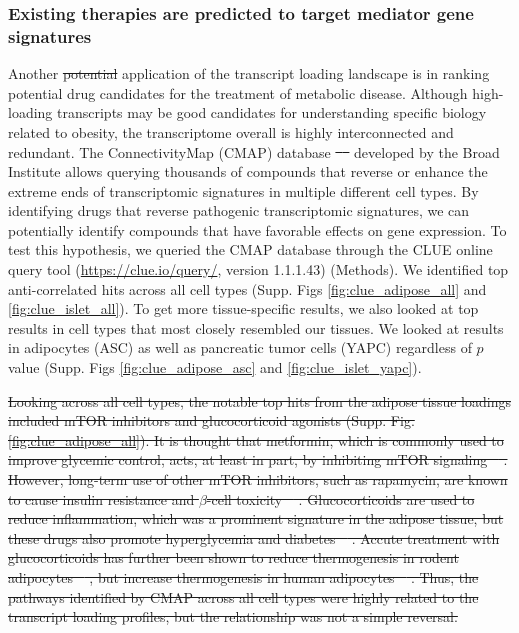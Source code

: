 \documentclass[
]{article}
\providecommand{\DIFaddtex}[1]{{\protect\color{blue}\uwave{#1}}} %
\providecommand{\DIFdeltex}[1]{{\protect\color{red}\sout{#1}}}                      %
\providecommand{\DIFaddbegin}{} %
\providecommand{\DIFaddend}{} %
\providecommand{\DIFdelbegin}{} %
\providecommand{\DIFdelend}{} %
\providecommand{\DIFadd}[1]{\texorpdfstring{\DIFaddtex{#1}}{#1}} %
\providecommand{\DIFdel}[1]{\texorpdfstring{\DIFdeltex{#1}}{}} %
\newcommand{\DIFscaledelfig}{0.5}
\newlength{\DIFdelgraphicswidth} %
\newlength{\DIFdelgraphicsheight} %
\newcommand{\DIFaddincludegraphics}[2][]{{\color{blue}\fbox{\DIFOincludegraphics[#1]{#2}}}} %
\newcommand{\DIFdelincludegraphics}[2][]{%
\sbox{\DIFdelgraphicsbox}{\DIFOincludegraphics[#1]{#2}}%
\settoboxwidth{\DIFdelgraphicswidth}{\DIFdelgraphicsbox} %
\settoboxtotalheight{\DIFdelgraphicsheight}{\DIFdelgraphicsbox} %
\scalebox{\DIFscaledelfig}{%
\parbox[b]{\DIFdelgraphicswidth}{\usebox{\DIFdelgraphicsbox}\\[-\baselineskip] \rule{\DIFdelgraphicswidth}{0em}}\llap{\resizebox{\DIFdelgraphicswidth}{\DIFdelgraphicsheight}{%
\setlength{\unitlength}{\DIFdelgraphicswidth}%
\begin{picture}(1,1)%
\thicklines\linethickness{2pt} %
{\color[rgb]{1,0,0}\put(0,0){\framebox(1,1){}}}%
{\color[rgb]{1,0,0}\put(0,0){\line( 1,1){1}}}%
{\color[rgb]{1,0,0}\put(0,1){\line(1,-1){1}}}%
\end{picture}%
}\hspace*{3pt}}} %
} %
\DeclareRobustCommand{\DIFaddbegin}{\DIFOaddbegin \let\includegraphics\DIFaddincludegraphics} %
\DeclareRobustCommand{\DIFaddend}{\DIFOaddend \let\includegraphics\DIFOincludegraphics} %
\DeclareRobustCommand{\DIFdelbegin}{\DIFOdelbegin \let\includegraphics\DIFdelincludegraphics} %
\DeclareRobustCommand{\DIFdelend}{\DIFOaddend \let\includegraphics\DIFOincludegraphics} %
\begin{document}
\subsubsection{Existing therapies are predicted to target mediator gene
signatures}\label{existing-therapies-are-predicted-to-target-mediator-gene-signatures}

Another \DIFdelbegin \DIFdel{potential }\DIFdelend application of the transcript loading landscape is in ranking
potential drug candidates for the treatment of metabolic disease.
Although high-loading transcripts may be good candidates for
understanding specific biology related to obesity, the transcriptome
overall is highly interconnected and redundant. The ConnectivityMap
(CMAP) database \DIFdelbegin \DIFdel{\mbox{%
\cite{pmid17008526} }\hskip0pt%
}\DIFdelend \DIFaddbegin \DIFadd{\mbox{%
\cite{pmid17008526, 
pmid29195078} }\hskip0pt%
}\DIFaddend developed by the Broad Institute allows querying thousands
of compounds that reverse or enhance the extreme ends of transcriptomic
signatures in multiple different cell types. By identifying drugs that
reverse pathogenic transcriptomic signatures, we can potentially
identify compounds that have favorable effects on gene expression. To
test this hypothesis, we queried the CMAP database through the CLUE
online query tool (\url{https://clue.io/query/}, version 1.1.1.43)
(Methods). We identified top anti-correlated hits across all cell types
(Supp. Figs \ref{fig:clue_adipose_all} and \ref{fig:clue_islet_all}). To
get more tissue-specific results, we also looked at top results in cell
types that most closely resembled our tissues. We looked at results in
adipocytes (ASC) as well as pancreatic tumor cells (YAPC) regardless of
\(p\) value (Supp. Figs \ref{fig:clue_adipose_asc} and
\ref{fig:clue_islet_yapc}).

\DIFdelbegin \DIFdel{Looking across all cell types, the notable top hits from the adipose
tissue loadings included mTOR inhibitors and glucocorticoid agonists
(Supp. Fig. \ref{fig:clue_adipose_all}). It is thought that metformin,
which is commonly used to improve glycemic control, acts, at least in
part, by inhibiting mTOR signaling \mbox{%
\cite{pmid30290005, 
pmid30034573}}\hskip0pt%
. However, long-term use of other mTOR inhibitors, such as
rapamycin, are known to cause insulin resistance and \(\beta\)-cell
toxicity \mbox{%
\cite{pmid30034573, pmid23881200, pmid21266327}}\hskip0pt%
.
Glucocorticoids are used to reduce inflammation, which was a prominent
signature in the adipose tissue, but these drugs also promote
hyperglycemia and diabetes \mbox{%
\cite{pmid24582093, pmid35585199}}\hskip0pt%
. Accute
treatment with glucocorticoids has further been shown to reduce
thermogenesis in rodent adipocytes \mbox{%
\cite{pmid30310815, 
pmid11254472, pmid23197361}}\hskip0pt%
, but increase thermogenesis in human
adipocytes \mbox{%
\cite{pmid27411014, pmid25385872}}\hskip0pt%
. Thus, the pathways
identified by CMAP across all cell types were highly related to the
transcript loading profiles, but the relationship was not a simple
reversal.
}%
\end{document}
